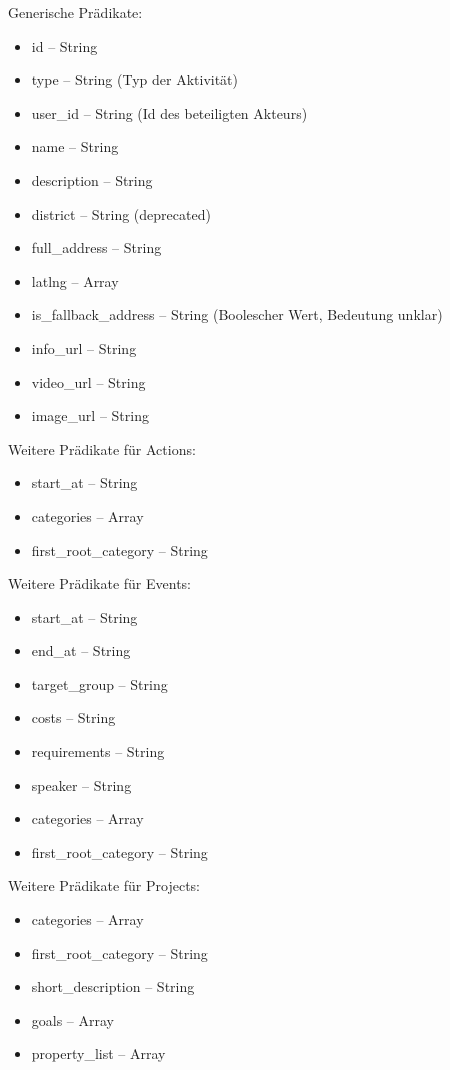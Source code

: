 \documentclass[a4paper,11pt]{article}
\begin{document}
Generische Prädikate:
\begin{itemize}\itemsep0pt
  \item id -- String
  \item type -- String (Typ der Aktivität)
  \item user\_id -- String (Id des beteiligten Akteurs)
  \item name -- String
  \item description -- String
  \item district -- String (deprecated)
  \item full\_address -- String
  \item latlng -- Array
  \item is\_fallback\_address -- String (Boolescher Wert, Bedeutung unklar)
  \item info\_url -- String
  \item video\_url -- String
  \item image\_url -- String
\end{itemize}

Weitere Prädikate für Actions:
\begin{itemize}\itemsep0pt
  \item start\_at -- String
  \item categories -- Array
  \item first\_root\_category -- String
\end{itemize}

Weitere Prädikate für Events:
\begin{itemize}\itemsep0pt
  \item start\_at -- String
  \item end\_at -- String
  \item target\_group -- String
  \item costs -- String
  \item requirements -- String
  \item speaker -- String
  \item categories -- Array
  \item first\_root\_category -- String
\end{itemize}

Weitere Prädikate für Projects:
\begin{itemize}\itemsep0pt
  \item categories -- Array
  \item first\_root\_category -- String
  \item short\_description -- String
  \item goals -- Array
  \item property\_list -- Array
\end{itemize}
\end{document}
